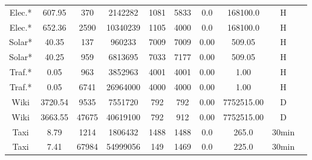 \begin{table}[htb]
\begin{tabular}{c | c c c c c c c c c}
        Elec.*            & 607.95         & 370              & 2142282         & 1081               & 5833              & 0.0           & 168100.0      & H               \\
        Elec.*            & 652.36         & 2590             & 10340239        & 1105               & 4000              & 0.0           & 168100.0      & H               \\
        \hline
        Solar*            & 40.35          & 137              & 960233          & 7009               & 7009              & 0.00          & 509.05        & H               \\
        Solar*            & 40.25          & 959              & 6813695         & 7033               & 7177              & 0.00          & 509.05        & H               \\
        \hline
        Traf.*            & 0.05           & 963              & 3852963         & 4001               & 4001              & 0.00          & 1.00          & H               \\
        Traf.*            & 0.05           & 6741             & 26964000        & 4000               & 4000              & 0.00          & 1.00          & H               \\
        \hline
        Wiki              & 3720.54        & 9535             & 7551720         & 792                & 792               & 0.00          & 7752515.00    & D               \\
        Wiki              & 3663.55        & 47675            & 40619100        & 792                & 912               & 0.00          & 7752515.00    & D               \\
        \hline
        Taxi              & 8.79           & 1214             & 1806432         & 1488               & 1488              & 0.0           & 265.0         & 30min           \\
        Taxi              & 7.41           & 67984            & 54999056        & 149                & 1469              & 0.0           & 225.0         & 30min           \\

\end{tabular}
\end{table}
